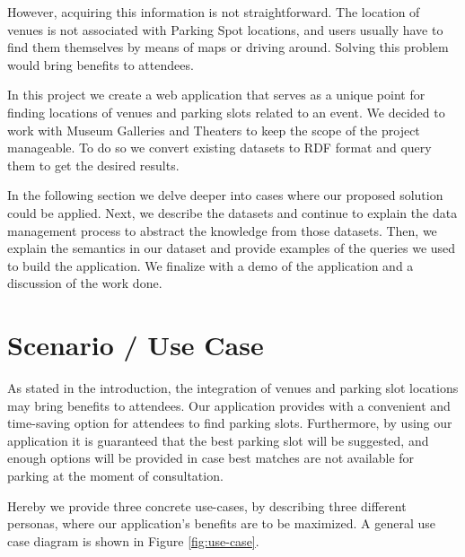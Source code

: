 \documentclass[runningheads,a4paper]{../../StyleFiles/llncs}
\begin{document}
However, acquiring this information is not straightforward. The location of venues is not associated with Parking Spot locations, and users usually have to find them themselves by means of maps or driving around. Solving this problem would bring benefits to attendees. %

In this project we create a web application that serves as a unique point for finding locations of venues and parking slots related to an event. We decided to work with Museum Galleries and Theaters to keep the scope of the project manageable. To do so we convert existing datasets to RDF format and query them to get the desired results.

In the following section we delve deeper into cases where our proposed solution could be applied. Next, we describe the datasets and continue to explain the data management process to abstract the knowledge from those datasets. Then, we explain the semantics in our dataset and provide examples of the queries we used to build the application. We finalize with a demo of the application and a discussion of the work done.  

\section{Scenario / Use Case}

As stated in the introduction, the integration of venues and parking slot locations may bring benefits to attendees. Our application provides with a convenient and time-saving option for attendees to find parking slots. Furthermore, by using our application it is guaranteed that the best parking slot will be suggested, and enough options will be provided in case best matches are not available for parking at the moment of consultation.

Hereby we provide three concrete use-cases, by describing three different personas, where our application's benefits are to be maximized. A general use case diagram is shown in Figure \ref{fig:use-case}. 
\end{document}
